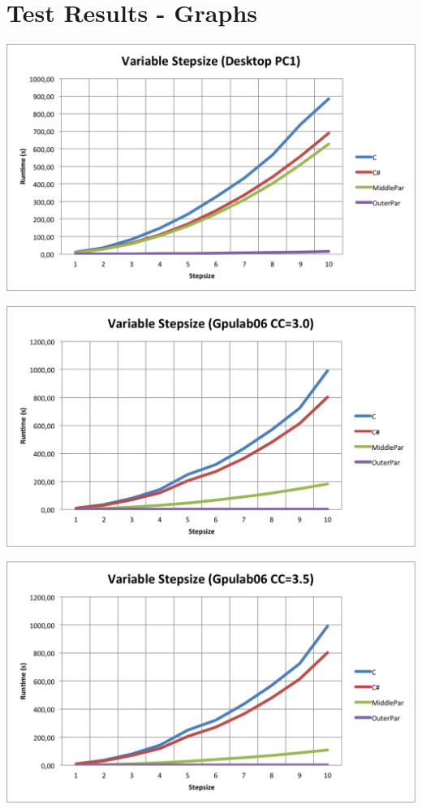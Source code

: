 \appendix
\section{Test Results - Graphs}
\label{app:graphs}

\centerline{\includegraphics[width=\textwidth]{img/desktop-stepsize.png}} 

\centerline{\includegraphics[width=\textwidth]{img/Gpulab-stepsize30.png}}

\centerline{\includegraphics[width=\textwidth]{img/Gpulab-stepsize35.png}}

